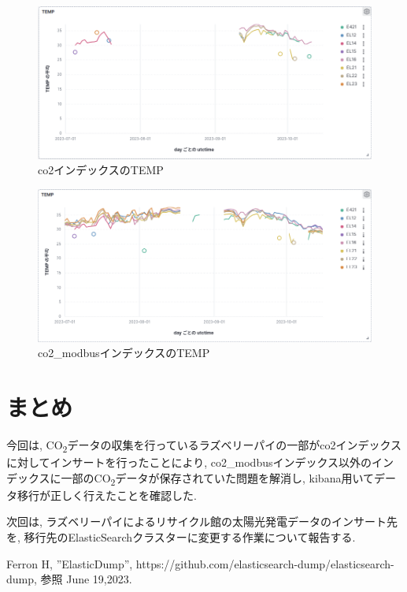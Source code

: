 \documentclass[a4j,12pt,]{jarticle}
\begin{document}
\begin{figure}[H]
  \begin{center}
    \includegraphics[width=160mm]{co2Temp.png}
    \caption{co2インデックスのTEMP}
    \label{p6}
  \end{center}
\end{figure}

\begin{figure}[H]
  \begin{center}
    \includegraphics[width=160mm]{co2ModbusTemp.png}
    \caption{co2\_modbusインデックスのTEMP}
    \label{p7}
  \end{center}
\end{figure}

\section{まとめ}
今回は, CO\textsubscript{2}データの収集を行っているラズベリーパイの一部がco2インデックスに対してインサートを行ったことにより, co2\_modbusインデックス以外のインデックスに一部のCO\textsubscript{2}データが保存されていた問題を解消し, kibana用いてデータ移行が正しく行えたことを確認した.

次回は, ラズベリーパイによるリサイクル館の太陽光発電データのインサート先を, 移行先のElasticSearchクラスターに変更する作業について報告する.

\begin{thebibliography}{5}
  Ferron H, ”ElasticDump”, https://github.com/elasticsearch-dump/elasticsearch-dump, 参照 June 19,2023.
\end{thebibliography}
\end{document}
